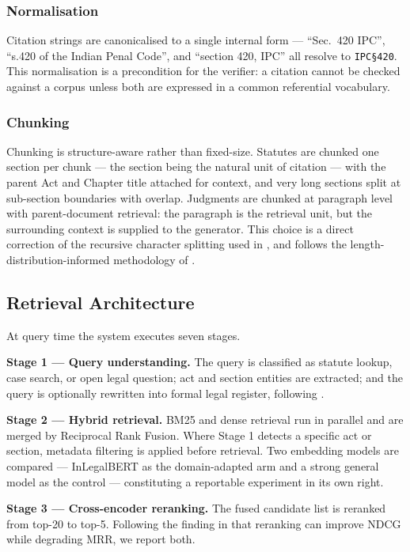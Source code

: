 \documentclass[conference]{IEEEtran}
\begin{document}
\subsubsection{Normalisation} Citation strings are canonicalised to a single internal form — ``Sec.\ 420 IPC'', ``s.420 of the Indian Penal Code'', and ``section 420, IPC'' all resolve to \texttt{IPC\S420}. This normalisation is a precondition for the verifier: a citation cannot be checked against a corpus unless both are expressed in a common referential vocabulary.

\subsubsection{Chunking} Chunking is structure-aware rather than fixed-size. Statutes are chunked one section per chunk — the section being the natural unit of citation — with the parent Act and Chapter title attached for context, and very long sections split at sub-section boundaries with overlap. Judgments are chunked at paragraph level with parent-document retrieval: the paragraph is the retrieval unit, but the surrounding context is supplied to the generator. This choice is a direct correction of the recursive character splitting used in \cite{patil2025}, and follows the length-distribution-informed methodology of \cite{rustamov2025}.

\subsection{Retrieval Architecture}

At query time the system executes seven stages.

\textbf{Stage 1 --- Query understanding.} The query is classified as statute lookup, case search, or open legal question; act and section entities are extracted; and the query is optionally rewritten into formal legal register, following \cite{patil2025}.

\textbf{Stage 2 --- Hybrid retrieval.} BM25 and dense retrieval run in parallel and are merged by Reciprocal Rank Fusion. Where Stage 1 detects a specific act or section, metadata filtering is applied before retrieval. Two embedding models are compared — InLegalBERT \cite{paul2023} as the domain-adapted arm and a strong general model as the control — constituting a reportable experiment in its own right.

\textbf{Stage 3 --- Cross-encoder reranking.} The fused candidate list is reranked from top-20 to top-5. Following the finding in \cite{rustamov2025} that reranking can improve NDCG while degrading MRR, we report both.
\end{document}
